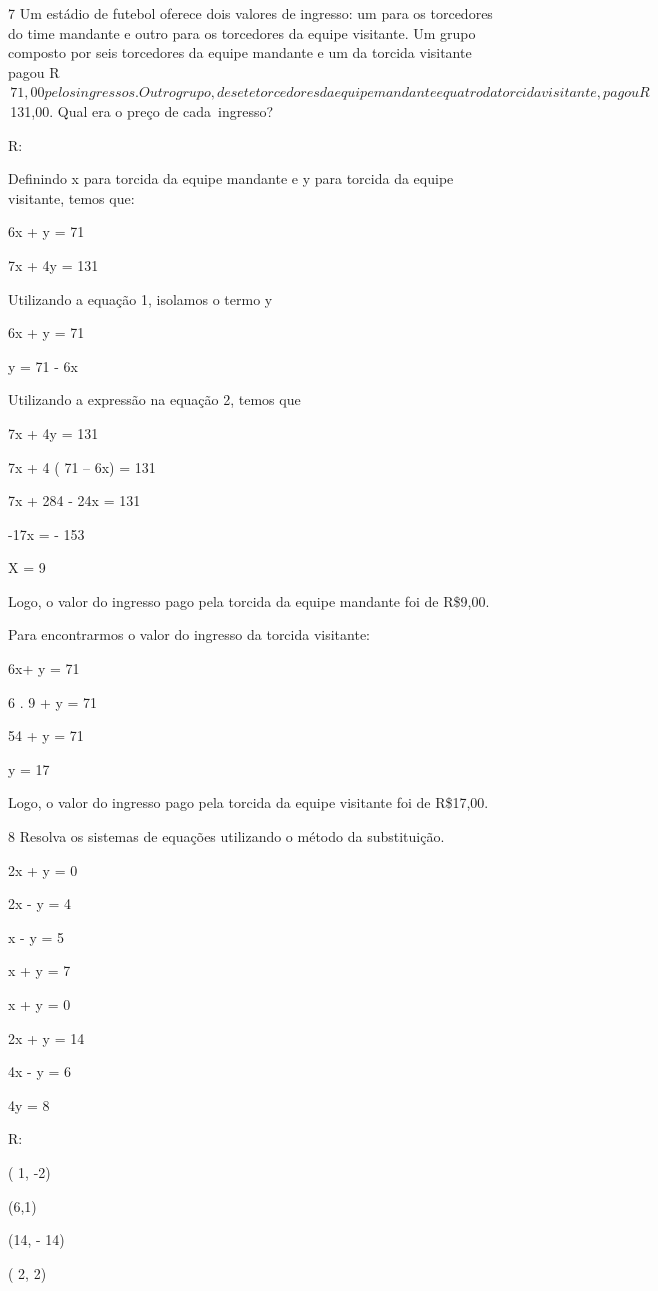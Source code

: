 {\num{7} Um estádio de futebol oferece dois valores de ingresso: um para os
torcedores do time mandante e outro para os torcedores da equipe visitante. Um
grupo composto por seis torcedores da equipe mandante e um da torcida
visitante pagou R$\,71,00 pelos ingressos. Outro grupo, de sete torcedores da
equipe mandante e quatro da torcida visitante, pagou R$\,131,00. Qual era o
preço de cada~ingresso?

R:

Definindo x para torcida da equipe mandante e y para torcida da equipe
visitante, temos que:

6x + y = 71

7x + 4y = 131

Utilizando a equação 1, isolamos o termo y

6x + y = 71

y = 71 - 6x

Utilizando a expressão na equação 2, temos que

7x + 4y = 131

7x + 4 ( 71 -- 6x) = 131

7x + 284 - 24x = 131

-17x = - 153

X = 9

Logo, o valor do ingresso pago pela torcida da equipe mandante foi de
R\$9,00.

Para encontrarmos o valor do ingresso da torcida visitante:

6x+ y = 71

6 . 9 + y = 71

54 + y = 71

y = 17

Logo, o valor do ingresso pago pela torcida da equipe visitante foi de
R\$17,00.

\num{8} Resolva os sistemas de equações utilizando o método da substituição.
\item 2x + y = 0

2x - y = 4
\item x - y = 5

x + y = 7
\item x + y = 0

2x + y = 14
\item 4x - y = 6

4y = 8

R:
\item ( 1, -2)
\item (6,1)
\item (14, - 14)
\item ( 2, 2)

}
